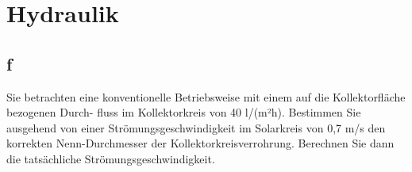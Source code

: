 \section{Hydraulik}
\label{sec:Hydraulik}
\subsection{f}
Sie betrachten eine konventionelle Betriebsweise mit einem auf die Kollektorfläche bezogenen Durch-
fluss im Kollektorkreis von 40 l/(m²h). Bestimmen Sie ausgehend von einer Strömungsgeschwindigkeit
im Solarkreis von 0,7 m/s den korrekten Nenn-Durchmesser der Kollektorkreisverrohrung. Berechnen
Sie dann die tatsächliche Strömungsgeschwindigkeit.